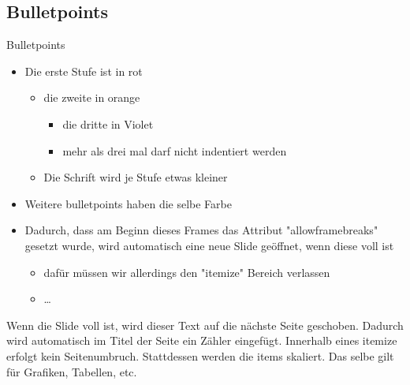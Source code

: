 \documentclass[aspectratio=169]{beamer}
\begin{document}
\subsection*{Bulletpoints}\label{sec:itemize}
\begin{frame}[allowframebreaks]{Bulletpoints}
    \begin{itemize}
        \item Die erste Stufe ist in rot
        \begin{itemize}
            \item die zweite in orange
            \begin{itemize}
                \item die dritte in Violet
                \item mehr als drei mal darf nicht indentiert werden
            \end{itemize}    
            \item Die Schrift wird je Stufe etwas kleiner
        \end{itemize}    
        \item Weitere bulletpoints haben die selbe Farbe
        \item Dadurch, dass am Beginn dieses Frames das Attribut "allowframebreaks" gesetzt wurde, wird automatisch eine neue Slide geöffnet, wenn diese voll ist
        \begin{itemize}
            \item dafür müssen wir allerdings den "itemize" Bereich verlassen
            \item \dots
        \end{itemize}
    \end{itemize}
    Wenn die Slide voll ist, wird dieser Text auf die nächste Seite geschoben.
    Dadurch wird automatisch im Titel der Seite ein Zähler eingefügt. 
    Innerhalb eines itemize erfolgt kein Seitenumbruch. 
    Stattdessen werden die items skaliert. 
    Das selbe gilt für Grafiken, Tabellen, etc.
\end{frame}

\end{document}
